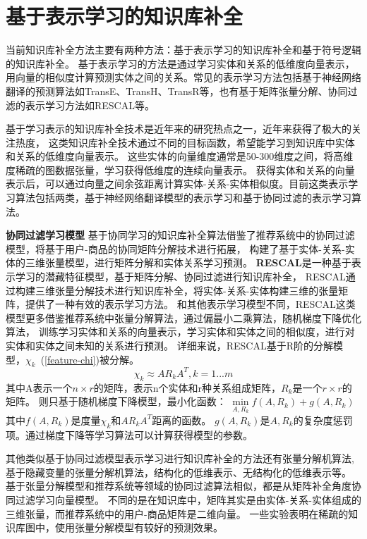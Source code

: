 \section{基于表示学习的知识库补全}
\label{cha:presentation}

当前知识库补全方法主要有两种方法：基于表示学习的知识库补全和基于符号逻辑的知识库补全。
基于表示学习的方法是通过学习实体和关系的低维度向量表示，
用向量的相似度计算预测实体之间的关系。常见的表示学习方法包括基于神经网络翻译的预测算法如TransE\cite{NIPS2013_5071}、TransH\cite{Wang2014KnowledgeGE}、TransR\cite{Huang2017ImprovedKB}等，也有基于矩阵张量分解、协同过滤的表示学习方法如RESCAL\cite{Nickel2011}等。

基于学习表示的知识库补全技术是近年来的研究热点之一，近年来获得了极大的关注热度，
这类知识库补全技术通过不同的目标函数，希望能学习到知识库中实体和关系的低维度向量表示。
这些实体的向量维度通常是50-300维度之间，将高维度稀疏的图数据张量，学习获得低维度的连续向量表示。
获得实体和关系的向量表示后，可以通过向量之间余弦距离计算实体-关系-实体相似度。目前这类表示学习算法包括两类，基于神经网络翻译模型的表示学习和基于协同过滤的表示学习算法。

\textbf{协同过滤学习模型} 基于协同学习的知识库补全算法借鉴了推荐系统中的协同过滤模型，将基于用户-商品的协同矩阵分解技术进行拓展，
构建了基于实体-关系-实体的三维张量模型，进行矩阵分解和实体关系学习预测。
\textbf{RESCAL}是一种基于表示学习的潜藏特征模型，基于矩阵分解、协同过滤进行知识库补全，
RESCAL通过构建三维张量分解技术进行知识库补全，将实体-关系-实体构建三维的张量矩阵，提供了一种有效的表示学习方法。
和其他表示学习模型不同，RESCAL这类模型更多借鉴推荐系统中张量分解算法，通过偏最小二乘算法，随机梯度下降优化算法，
训练学习实体和关系的向量表示，学习实体和实体之间的相似度，进行对实体和实体之间未知的关系进行预测。
详细来说，RESCAL基于R阶的分解模型，$\chi_k$~(\ref{feature-chi})被分解。
\begin{equation}
\label{equ:chap:feature-chi}
\chi_k \approx AR_{k}A^T, k =1...m
\end{equation}
其中A表示一个$n\times r$的矩阵，表示n个实体和r种关系组成矩阵，$R_{k}$是一个$r\times r$的矩阵。
则只基于随机梯度下降模型，最小化函数：
$\min \limits_{A,R_k} f(A,R_k)+g(A,R_k)$
其中$f(A,R_k)$是度量$\chi_k$和$AR_{k}A^T$距离的函数。
$g(A,R_k)$是$A,R_k$的复杂度惩罚项。通过梯度下降等学习算法可以计算获得模型的参数。

其他类似基于协同过滤模型表示学习进行知识库补全的方法还有张量分解机算法\cite{Rendle2010FactorizationM},
基于隐藏变量的张量分解机算法\cite{Rendle2012FactorizationMW}，结构化的低维表示\cite{2009EmbeddingLS}、无结构化的低维表示等。
基于张量分解模型和推荐系统等领域的协同过滤算法相似，都是从矩阵补全角度协同过滤学习向量模型。
不同的是在知识库中，矩阵其实是由实体-关系-实体组成的三维张量，而推荐系统中的用户-商品矩阵是二维向量。
一些实验\cite{Dong2014}表明在稀疏的知识库图中，使用张量分解模型有较好的预测效果。

